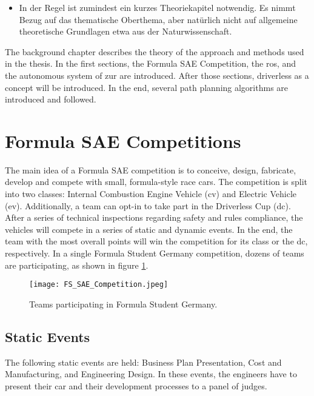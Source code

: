 \begin{itemize}
    \item In der Regel ist zumindest ein kurzes Theoriekapitel notwendig. Es nimmt Bezug auf das thematische Oberthema, aber natürlich nicht auf allgemeine theoretische Grundlagen etwa aus der Naturwissenschaft.
\end{itemize}
The background chapter describes the theory of the approach and methods used in the thesis. In the first sections, the Formula SAE Competition, the \acrlong{ros}, and the autonomous system of \acrlong{zur} are introduced. After those sections, driverless as a concept will be introduced. In the end, several path planning algorithms are introduced and followed.

\section{Formula SAE Competitions} \label{sec:Formula SAE Competitions}
The main idea of a Formula SAE competition is to conceive, design, fabricate, develop and compete with small, formula-style race cars.
The competition is split into two classes: Internal Combustion Engine Vehicle (\acrshort{cv}) and Electric Vehicle (\acrshort{ev}).
Additionally, a team can opt-in to take part in the Driverless Cup (\acrshort{dc}).
After a series of technical inspections regarding safety and rules compliance, the vehicles will compete in a series of static and dynamic events. In the end, the team with the most overall points will win the competition for its class or the \acrlong{dc}, respectively. \cite{fs_rules_2022_handbook}
In a single Formula Student Germany competition, dozens of teams are participating, as shown in figure \ref{fig:FS SAE Competition}.
\begin{figure}[H]
    \centering
    \texttt{[image: FS\_SAE\_Competition.jpeg]}
    \caption{Teams participating in Formula Student Germany. \cite{fs_germany}}
    \label{fig:FS SAE Competition}
\end{figure}

\subsection{Static Events} \label{sec:Static Events}
The following static events are held: Business Plan Presentation, Cost and Manufacturing, and Engineering Design. In these events, the engineers have to present their car and their development processes to a panel of judges. \cite{fs_rules_2022_handbook}

